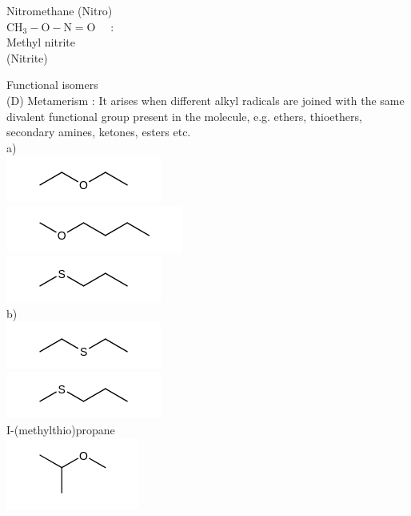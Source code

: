 \documentclass[10pt]{article}
\begin{document}
Nitromethane (Nitro)\\
$\mathrm{CH}_{3}-\mathrm{O}-\mathrm{N}=\mathrm{O} \quad$ :\\
Methyl nitrite\\
(Nitrite)

Functional isomers\\
(D) Metamerism : It arises when different alkyl radicals are joined with the same divalent functional group present in the molecule, e.g. ethers, thioethers, secondary amines, ketones, esters etc.\\
a)\\
\includegraphics{smile-5f7fe2f96eac17e2087685670b7acb41461cac1e}\\
\includegraphics{smile-79984a6081cdc9f9fafe344db5f0062879272935}\\
\includegraphics{smile-b8690e47ea955ad4ec02cc00225b65cebcc5867b}\\
b)\\
\includegraphics{smile-77786d847710fa5f7ce8cc77c3f01feec74934c4}\\
\includegraphics{smile-aac57abf58847784ed3ab946a912203b54aef919}\\
I-(methylthio)propane\\
\includegraphics{smile-868805d0fad286b412e0d787fbfb63a0de163c9e}\\
\end{document}
